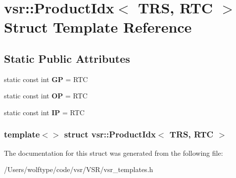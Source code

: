 \hypertarget{structvsr_1_1_product_idx_3_01_t_r_s_00_01_r_t_c_01_4}{\section{vsr\-:\-:Product\-Idx$<$ T\-R\-S, R\-T\-C $>$ Struct Template Reference}
\label{structvsr_1_1_product_idx_3_01_t_r_s_00_01_r_t_c_01_4}
}
\subsection*{Static Public Attributes}
\begin{DoxyCompactItemize}
\item 
\hypertarget{structvsr_1_1_product_idx_3_01_t_r_s_00_01_r_t_c_01_4_a18c02650c745cfa7caa998c052bf1c62}{static const int {\bfseries G\-P} = R\-T\-C}\label{structvsr_1_1_product_idx_3_01_t_r_s_00_01_r_t_c_01_4_a18c02650c745cfa7caa998c052bf1c62}

\item 
\hypertarget{structvsr_1_1_product_idx_3_01_t_r_s_00_01_r_t_c_01_4_a60bfe9ff1361bf788359186711ccd905}{static const int {\bfseries O\-P} = R\-T\-C}\label{structvsr_1_1_product_idx_3_01_t_r_s_00_01_r_t_c_01_4_a60bfe9ff1361bf788359186711ccd905}

\item 
\hypertarget{structvsr_1_1_product_idx_3_01_t_r_s_00_01_r_t_c_01_4_a62c38992ed0f7fe43e852e162ce51028}{static const int {\bfseries I\-P} = R\-T\-C}\label{structvsr_1_1_product_idx_3_01_t_r_s_00_01_r_t_c_01_4_a62c38992ed0f7fe43e852e162ce51028}

\end{DoxyCompactItemize}
\subsubsection*{template$<$$>$ struct vsr\-::\-Product\-Idx$<$ T\-R\-S, R\-T\-C $>$}



The documentation for this struct was generated from the following file\-:\begin{DoxyCompactItemize}
\item 
/\-Users/wolftype/code/vsr/\-V\-S\-R/vsr\-\_\-templates.\-h\end{DoxyCompactItemize}
